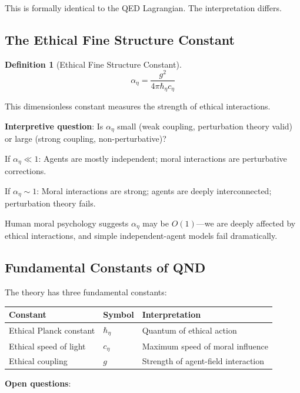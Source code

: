 \documentclass[12pt]{article}
\newtheorem{definition}{Definition}[section]
\begin{document}
This is formally identical to the QED Lagrangian. The interpretation differs.

\subsection{The Ethical Fine Structure Constant}

\begin{definition}[Ethical Fine Structure Constant]
\begin{equation}
    \alpha_\eta = \frac{g^2}{4\pi\hbar_\eta c_\eta}
\end{equation}
\end{definition}

This dimensionless constant measures the strength of ethical interactions.

\textbf{Interpretive question}: Is $\alpha_\eta$ small (weak coupling, perturbation theory valid) or large (strong coupling, non-perturbative)?

If $\alpha_\eta \ll 1$: Agents are mostly independent; moral interactions are perturbative corrections.

If $\alpha_\eta \sim 1$: Moral interactions are strong; agents are deeply interconnected; perturbation theory fails.

Human moral psychology suggests $\alpha_\eta$ may be $O(1)$---we are deeply affected by ethical interactions, and simple independent-agent models fail dramatically.

\subsection{Fundamental Constants of QND}

The theory has three fundamental constants:

\begin{table}[h]
\centering
\begin{tabular}{lll}
\toprule
\textbf{Constant} & \textbf{Symbol} & \textbf{Interpretation} \\
\midrule
Ethical Planck constant & $\hbar_\eta$ & Quantum of ethical action \\
Ethical speed of light & $c_\eta$ & Maximum speed of moral influence \\
Ethical coupling & $g$ & Strength of agent-field interaction \\
\bottomrule
\end{tabular}
\end{table}

\textbf{Open questions}:
\end{document}
